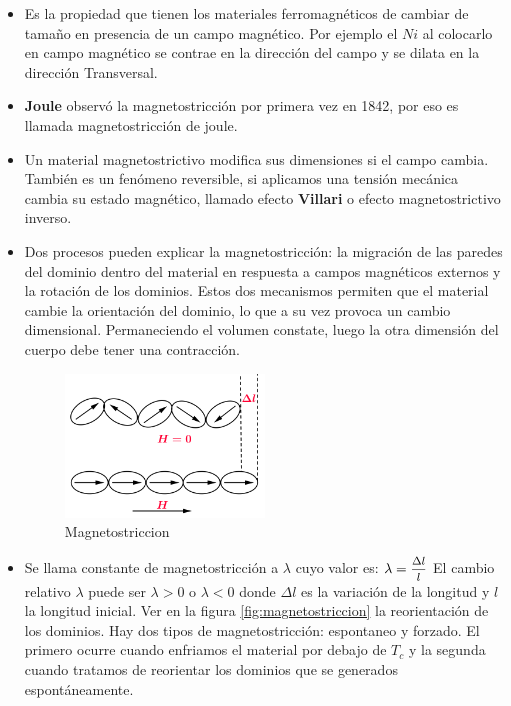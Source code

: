 \begin{itemize}
	\item Es la propiedad que tienen los materiales ferromagnéticos de cambiar de tamaño en presencia de un campo magnético. Por ejemplo el $Ni$ al colocarlo en campo magnético se contrae en la dirección del campo y se dilata en la dirección Transversal.
	
	\item \textbf{Joule} observó la magnetostricción por primera vez en 1842, por eso es llamada magnetostricción de joule.
	
	\item Un material magnetostrictivo modifica sus dimensiones si el campo cambia. También es un fenómeno reversible, si aplicamos una tensión mecánica cambia su estado magnético, llamado
efecto \textbf{Villari} o efecto magnetostrictivo inverso.

	\item Dos procesos pueden explicar la magnetostricción: la migración de las paredes del dominio dentro del material en respuesta a campos magnéticos externos y la rotación de los dominios. Estos dos mecanismos permiten que el material cambie la orientación del dominio, lo que a su vez provoca un cambio dimensional. Permaneciendo el volumen constate, luego la otra dimensión del cuerpo debe tener una contracción.
	
	
	\begin{figure}[H]
    \centering
    \includegraphics[width=0.5\textwidth]{./Figures/magnetostriccion}
	\caption{Magnetostriccion}
	\label{fig:magnetostriccion_1}
	\end{figure}
	
	\item Se llama constante de magnetostricción a $\lambda$ cuyo valor es: $\lambda=\mfrac{\Delta l}{l}$
	El cambio relativo $\lambda$ puede ser $\lambda> 0$ o $\lambda< 0$ donde $\Delta l$ es la variación de la longitud y $l$ la longitud inicial. Ver en la figura \ref{fig:magnetostriccion} la reorientación de los dominios. Hay dos tipos de magnetostricción: espontaneo y forzado. El primero ocurre cuando enfriamos el material por debajo de $T_{c}$ y la segunda cuando tratamos de reorientar los dominios que se generados espontáneamente.
\end{itemize}

